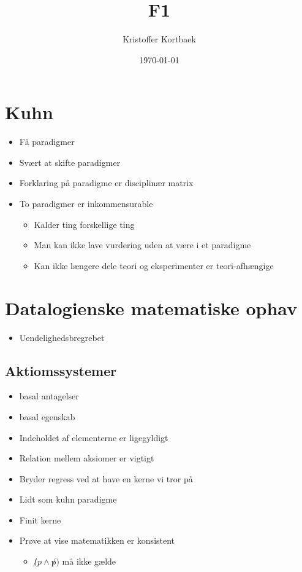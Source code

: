 \documentclass[11pt]{article}
\author{Kristoffer Kortbaek}
\date{\today}
\title{F1}
\begin{document}
\maketitle
\tableofcontents


\section{Kuhn}
\label{sec:org5a986b2}
\begin{itemize}
\item Få paradigmer
\item Svært at skifte paradigmer
\item Forklaring på paradigme er disciplinær matrix
\item To paradigmer er inkommensurable
\begin{itemize}
\item Kalder ting forskellige ting
\item Man kan ikke lave vurdering uden at være i et paradigme
\item Kan ikke længere dele teori og eksperimenter er teori-afhængige
\end{itemize}
\end{itemize}

\section{Datalogienske matematiske ophav}
\label{sec:orgcccc52f}
\begin{itemize}
\item Uendelighedsbregrebet
\end{itemize}

\subsection{Aktiomssystemer}
\label{sec:org45a5f54}
\begin{itemize}
\item basal antagelser
\item basal egenskab
\item Indeholdet af elementerne er ligegyldigt
\item Relation mellem aksiomer er vigtigt
\item Bryder regress ved at have en kerne vi tror på
\item Lidt som kuhn paradigme
\item Finit kerne
\item Prøve at vise matematikken er konsistent
\begin{itemize}
\item \(\not(p \land \not p)\) må ikke gælde
\end{itemize}
\end{itemize}
\end{document}
